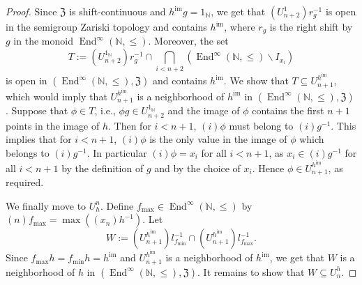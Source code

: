 \documentclass[11pt]{amsart}
\makeatletter
\theoremstyle{definition}
\newcommand{\N}{\mathbb N}
\newcommand{\im}{\operatorname{im}}
\newcommand{\makeset}[2]{\left\lbrace #1 \; \colon\;
 \begin{tabular}{@{}l@{}}
   #2
  \end{tabular}
  \right\rbrace}
\makeatother
\begin{document}
\begin{proof}
Since $\mathfrak Z$ is shift-continuous and $h^{\im}g=1_\N$, we get that 
\((U_{n+2}^1) r_g^{-1}\) 
is open in the semigroup Zariski topology and contains \(h^{\im}\), where $r_g$ is the right shift by $g$ in the monoid $\operatorname{End}^\infty(\N,\leq)$. Moreover, the set $$T:=(U_{n+2}^{1_\N}) r_g^{-1}\cap \bigcap_{i<{n+2}} (\operatorname{End}^\infty(\N,\leq)\backslash I_{x_i})$$ is open in $(\operatorname{End}^\infty(\N,\leq),\mathfrak Z)$ and contains $h^{\im}$. 
We show that $T\subseteq U_{n+1}^{h^{\im}}$, which would imply that $ U_{n+1}^{h^{\im}}$ is a neighborhood of $h^{\im}$ in $(\operatorname{End}^\infty(\N,\leq),\mathfrak Z)$.
 Suppose that \(\phi\in T\), i.e., \(\phi g \in U_{n+2}^{1_\N}\) and the image of \(\phi\) contains the first \(n+1\) points in the image of \(h\). Then for \(i<n+1\), \((i)\phi\) must belong to \((i)g^{-1}\). This implies that for \(i<n+1\), \((i)\phi\) is the only value in the image of \(\phi\) which belongs to \((i)g^{-1}\). In particular \((i)\phi=x_i\) for all $i<n+1$, as $x_i\in (i)g^{-1}$ for all $i<n+1$ by the definition of $g$ and by the choice of $x_i$. Hence $\phi\in U_{n+1}^{h^{\im}}$, as required.


We finally move to \(U_h^n\). Define $f_{\max}\in \operatorname{End}^\infty(\N,\leq)$ by $(n)f_{\max}=\max((x_n)h^{-1})$.  Let $$W:=(U_{n+1}^{h^{\im}})l_{f_{\min}}^{-1}\cap (U_{n+1}^{h^{\im}}) l_{f_{\max}}^{-1}.$$ Since \(f_{\max}h=f_{\min}h=h^{\im}\) and $U_{n+1}^{h^{\im}}$ is a neighborhood of $h^{\im}$, we get that $W$ is a neighborhood of $h$ in $(\operatorname{End}^\infty(\N,\leq),\mathfrak Z)$. It remains to show that $W\subseteq U_{n}^h$.


\end{proof}
\end{document}
